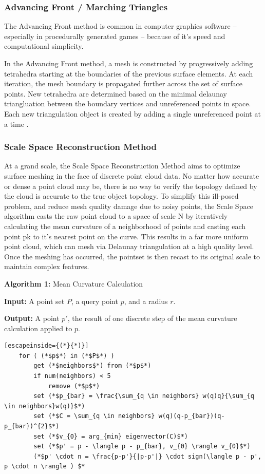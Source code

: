 \documentclass[12pt]{drexelthesis}
\let\Oldsubsubsection\subsubsection
\renewcommand{\subsubsection}{\FloatBarrier\Oldsubsubsection}
\begin{document}
\subsubsection{Advancing Front / Marching Triangles}
The Advancing Front method is common in computer graphics software – especially in procedurally generated games – because of it’s speed and computational simplicity.

In the Advancing Front method, a mesh is constructed by progressively adding tetrahedra starting at the boundaries of the previous surface elements. At each iteration, the mesh boundary is propagated further across the set of surface points. New tetrahedra are determined based on the minimal delaunay triangluation between the boundary vertices and unreferenced points in space. Each new triangulation object is created by adding a single unreferenced point at a time \cite{RN66}.

\subsubsection{Scale Space Reconstruction Method}
At a grand scale, the Scale Space Reconstruction Method aims to optimize surface meshing in the face of discrete point cloud data. No matter how accurate or dense a point cloud may be, there is no way to verify the topology defined by the cloud is accurate to the true object topology. To simplify this ill-posed problem, and reduce mesh quality damage due to noisy points, the Scale Space algorithm casts the raw point cloud to a space of scale N by iteratively calculating the mean curvature of a neighborhood of points and casting each point pk to it’s nearest point on the curve. This results in a far more uniform point cloud, which can mesh via Delaunay triangulation at a high quality level. Once the meshing has occurred, the pointset is then recast to its original scale to maintain complex features. 

\textbf{Algorithm 1:} Mean Curvature Calculation

  \textbf{Input:} A point set $P$, a query point $p$, and a radius $r$.
	
  \textbf{Output:} A point $p'$, the result of one discrete step of the mean curvature calculation applied to $p$.
\begin{lstlisting}[escapeinside={(*}{*)}]
	for ( (*$p$*) in (*$P$*) )
		get (*$neighbors$*) from (*$p$*)
		if num(neighbors) < 5
			remove (*$p$*)
		set (*$p_{bar} = \frac{\sum_{q \in neighbors} w(q)q}{\sum_{q \in neighbors}w(q)}$*)
		set (*$C = \sum_{q \in neighbors} w(q)(q-p_{bar})(q-p_{bar})^{2}$*)
		set (*$v_{0} = arg_{min} eigenvector(C)$*)
		set (*$p' = p - \langle p - p_{bar}, v_{0} \rangle v_{0}$*)
		(*$p' \cdot n = \frac{p-p'}{|p-p'|} \cdot sign(\langle p - p', p \cdot n \rangle ) $*	
\end{lstlisting}
\end{document}
